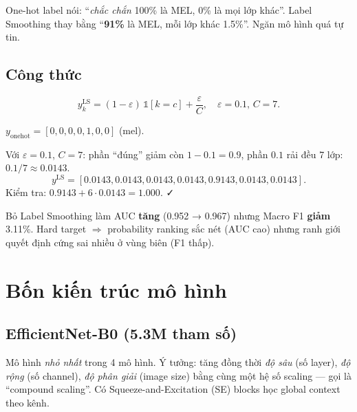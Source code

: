 \documentclass[11pt,a4paper]{article}
\begin{document}
\begin{simple}
One-hot label nói: ``\textit{chắc chắn} 100\% là MEL, 0\% là mọi lớp khác''. Label Smoothing thay bằng ``\textbf{91\%} là MEL, mỗi lớp khác 1.5\%''. Ngăn mô hình quá tự tin.
\end{simple}

\subsection{Công thức}

\[
  y^{\text{LS}}_k = (1 - \varepsilon) \, \mathbb{1}[k = c] + \frac{\varepsilon}{C}, \quad \varepsilon = 0.1, \, C = 7.
\]

\begin{example}
$y_{\text{onehot}} = [0,0,0,0,1,0,0]$ (mel).

Với $\varepsilon = 0.1$, $C = 7$: phần ``đúng'' giảm còn $1 - 0.1 = 0.9$, phần $0.1$ rải đều 7 lớp: $0.1 / 7 \approx 0.0143$.
\[
  y^{\text{LS}} = [\mathbf{0.0143}, 0.0143, 0.0143, 0.0143, \mathbf{0.9143}, 0.0143, 0.0143].
\]
Kiểm tra: $0.9143 + 6 \cdot 0.0143 = 1.000$. ✓
\end{example}

\begin{idea}
Bỏ Label Smoothing làm AUC \textbf{tăng} (0.952 → 0.967) nhưng Macro F1 \textbf{giảm} 3.11\%. Hard target $\Rightarrow$ probability ranking sắc nét (AUC cao) nhưng ranh giới quyết định cứng sai nhiều ở vùng biên (F1 thấp).
\end{idea}

\section{Bốn kiến trúc mô hình}

\subsection{EfficientNet-B0 (5.3M tham số)}

\begin{simple}
Mô hình \textit{nhỏ nhất} trong 4 mô hình. Ý tưởng: tăng đồng thời \textit{độ sâu} (số layer), \textit{độ rộng} (số channel), \textit{độ phân giải} (image size) bằng cùng một hệ số scaling --- gọi là ``compound scaling''. Có Squeeze-and-Excitation (SE) blocks học global context theo kênh.
\end{simple}
\end{document}
